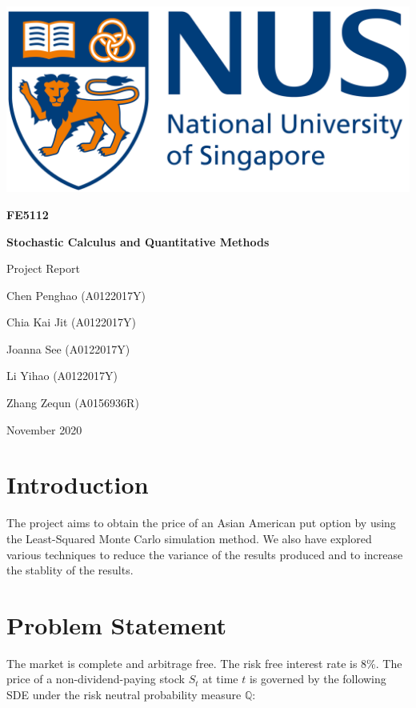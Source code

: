 \documentclass[12pt]{article}
\begin{document}
\begin{titlepage}
\centering
{
	\includegraphics[scale=0.08]{./media/0.png}\\
	\vfill
	{\Large \textbf{FE5112}\par}
	{\Large \textbf{Stochastic Calculus and Quantitative Methods}\par}
	{\Large Project Report\par}
	\vfill
	{\normalsize Chen Penghao (A0122017Y)\par}
	{\normalsize Chia Kai Jit (A0122017Y)\par}
	{\normalsize Joanna See (A0122017Y)\par}
	{\normalsize Li Yihao (A0122017Y)\par}
	{\normalsize Zhang Zequn (A0156936R)\par}
	\vfill
	{ November 2020\par}
}
\end{titlepage}

\section{Introduction}
The project aims to obtain the price of an Asian American put option by using the Least-Squared Monte Carlo simulation method.  We also have explored various techniques to reduce the variance of the results produced and to increase the stablity of the results.

\section{Problem Statement}

The market is complete and arbitrage free. The risk free interest rate is 8\%. The price of a non-dividend-paying stock $S_t$ at time $t$ is governed by the following SDE under the risk neutral probability measure $\mathbb{Q}$:
\end{document}
